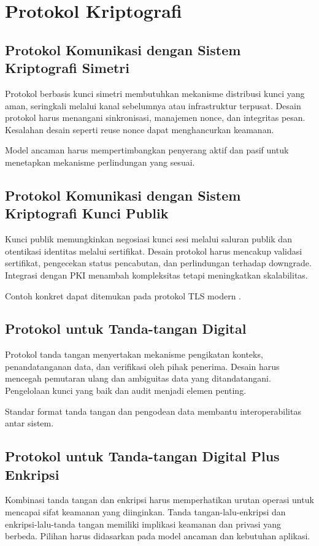 \documentclass[../main.tex]{subfiles}
\begin{document}
\chapter{Protokol Kriptografi}

\section{Protokol Komunikasi dengan Sistem Kriptografi Simetri}
Protokol berbasis kunci simetri membutuhkan mekanisme distribusi kunci yang aman, seringkali melalui kanal sebelumnya atau infrastruktur terpusat. Desain protokol harus menangani sinkronisasi, manajemen nonce, dan integritas pesan. Kesalahan desain seperti reuse nonce dapat menghancurkan keamanan.

Model ancaman harus mempertimbangkan penyerang aktif dan pasif untuk menetapkan mekanisme perlindungan yang sesuai.

\section{Protokol Komunikasi dengan Sistem Kriptografi Kunci Publik}
Kunci publik memungkinkan negosiasi kunci sesi melalui saluran publik dan otentikasi identitas melalui sertifikat. Desain protokol harus mencakup validasi sertifikat, pengecekan status pencabutan, dan perlindungan terhadap downgrade. Integrasi dengan PKI menambah kompleksitas tetapi meningkatkan skalabilitas.

Contoh konkret dapat ditemukan pada protokol TLS modern \parencite{rfc8446}.

\section{Protokol untuk Tanda-tangan Digital}
Protokol tanda tangan menyertakan mekanisme pengikatan konteks, penandatanganan data, dan verifikasi oleh pihak penerima. Desain harus mencegah pemutaran ulang dan ambiguitas data yang ditandatangani. Pengelolaan kunci yang baik dan audit menjadi elemen penting.

Standar format tanda tangan dan pengodean data membantu interoperabilitas antar sistem.

\section{Protokol untuk Tanda-tangan Digital Plus Enkripsi}
Kombinasi tanda tangan dan enkripsi harus memperhatikan urutan operasi untuk mencapai sifat keamanan yang diinginkan. Tanda tangan-lalu-enkripsi dan enkripsi-lalu-tanda tangan memiliki implikasi keamanan dan privasi yang berbeda. Pilihan harus didasarkan pada model ancaman dan kebutuhan aplikasi.
\end{document}
